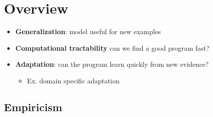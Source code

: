 \chapter{Overview}

\begin{itemize}
  \item \textbf{Generalization}: model useful for new examples
  \item \textbf{Computational tractability} can we find a good program fast?
  \item \textbf{Adaptation}: can the program learn quickly from new evidence?
  \begin{itemize}
    \item Ex. domain specific adaptation
  \end{itemize}
\end{itemize}

\section{Empiricism}
